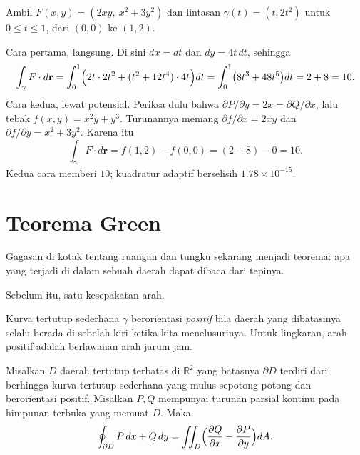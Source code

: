 \begin{contoh}
 Ambil $F(x,y)=(2xy,\ x^{2}+3y^{2})$ dan lintasan
$\gamma(t)=(t,2t^{2})$ untuk $0\le t\le1$, dari $(0,0)$ ke $(1,2)$.

Cara pertama, langsung. Di sini $dx=dt$ dan $dy=4t\,dt$, sehingga
\[
\int_{\gamma}F\cdot d\mathbf{r}
=\int_{0}^{1}\Bigl(2t\cdot 2t^{2}+(t^{2}+12t^{4})\cdot 4t\Bigr)dt
=\int_{0}^{1}\bigl(8t^{3}+48t^{5}\bigr)dt=2+8=10 .
\]
Cara kedua, lewat potensial. Periksa dulu bahwa $\partial P/\partial
y=2x=\partial Q/\partial x$, lalu tebak $f(x,y)=x^{2}y+y^{3}$. Turunannya
memang $\partial f/\partial x=2xy$ dan $\partial f/\partial y=x^{2}+3y^{2}$.
Karena itu
\[
\int_{\gamma}F\cdot d\mathbf{r}=f(1,2)-f(0,0)=(2+8)-0=10 .
\]
Kedua cara memberi $10$; kuadratur adaptif berselisih $1.78\times10^{-15}$.
\end{contoh}

\section{Teorema Green}

Gagasan di kotak tentang ruangan dan tungku sekarang menjadi teorema: apa yang
terjadi di dalam sebuah daerah dapat dibaca dari tepinya.

Sebelum itu, satu kesepakatan arah.

\begin{definisi}
 Kurva tertutup sederhana $\gamma$ berorientasi
\emph{positif} bila daerah yang dibatasinya selalu berada di sebelah kiri
ketika kita menelusurinya. Untuk lingkaran, arah positif adalah berlawanan
arah jarum jam.
\end{definisi}

\begin{teorema}[Green]
Misalkan $D$ daerah tertutup terbatas di $\mathbb{R}^{2}$ yang batasnya
$\partial D$ terdiri dari berhingga kurva tertutup sederhana yang mulus
sepotong-potong dan berorientasi positif. Misalkan $P,Q$ mempunyai turunan
parsial kontinu pada himpunan terbuka yang memuat $D$. Maka
\[
\oint_{\partial D}P\,dx+Q\,dy=\iint_{D}\Bigl(\frac{\partial Q}{\partial x}
-\frac{\partial P}{\partial y}\Bigr)dA .
\]
\end{teorema}

